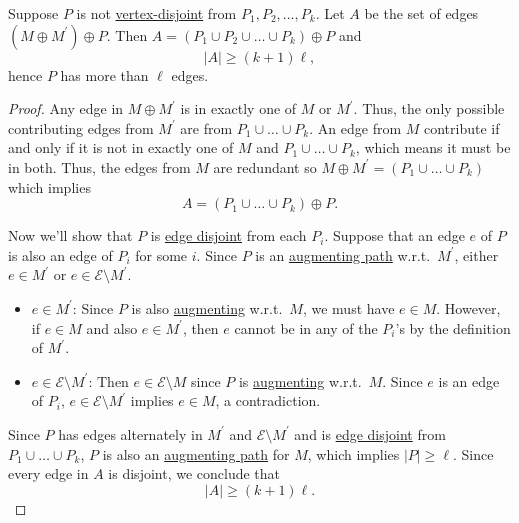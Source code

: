 \begin{lemma}\label{lma:lec25-4}
	Suppose \(P\) is not \hyperref[def:vertex-independent]{vertex-disjoint} from \(P_1, P_2, \dots , P_k \). Let \(A\) be the set of edges \((M\oplus M^\prime )\oplus P\). Then \(A = (P_1\cup P_2 \cup \dots \cup P_k )\oplus P\) and
	\[
		\left\vert A \right\vert \geq (k+1)\ell,
	\]
	hence \(P\) has more than \(\ell \) edges.
\end{lemma}
\begin{proof}
	Any edge in \(M\oplus M^\prime \) is in exactly one of \(M\) or \(M^\prime \). Thus, the only possible contributing edges from \(M^\prime \) are from \(P_1 \cup \dots  \cup P_k\). An edge from \(M\) contribute if and only if it is not in exactly one of \(M\) and \(P_1 \cup \dots  \cup P_k\), which means it must be in both. Thus, the edges from \(M\) are redundant so \(M\oplus M^\prime = (P_1 \cup \dots \cup P_k )\) which implies
	\[
		A = (P_1 \cup \dots  \cup P_k)\oplus P.
	\]

	Now we'll show that \(P\) is \hyperref[def:edge-independent]{edge disjoint} from each \(P_i\). Suppose that an edge \(e\) of \(P\) is also an edge of \(P_i\) for some \(i\). Since \(P\) is an \hyperref[def:augmenting-path]{augmenting path} w.r.t.\ \(M^\prime \), either \(e\in M^\prime \) or \(e\in \mathcal{E} \setminus M^\prime \).
	\begin{itemize}
		\item \(e\in M^\prime \): Since \(P\) is also \hyperref[def:augmenting-path]{augmenting} w.r.t.\ \(M\), we must have \(e\in M\). However, if \(e\in M\) and also \(e\in M^\prime \), then \(e\) cannot be in any of the \(P_i\)'s by the definition of \(M^\prime \).
		\item \(e\in \mathcal{E} \setminus M^\prime \): Then \(e\in \mathcal{E} \setminus M\) since \(P\) is \hyperref[def:augmenting-path]{augmenting} w.r.t.\ \(M\). Since \(e\) is an edge of \(P_i\), \(e\in \mathcal{E} \setminus M^\prime \) implies \(e\in M\), a contradiction.
	\end{itemize}

	Since \(P\) has edges alternately in \(M^\prime \) and \(\mathcal{E} \setminus M^\prime \) and is \hyperref[def:edge-independent]{edge disjoint} from \(P_1 \cup \dots  \cup P_k\), \(P\) is also an \hyperref[def:augmenting-path]{augmenting path} for \(M\), which implies \(\left\vert P \right\vert \geq \ell \). Since every edge in \(A\) is disjoint, we conclude that
	\[
		\left\vert A \right\vert \geq (k + 1) \ell .
	\]
\end{proof}

